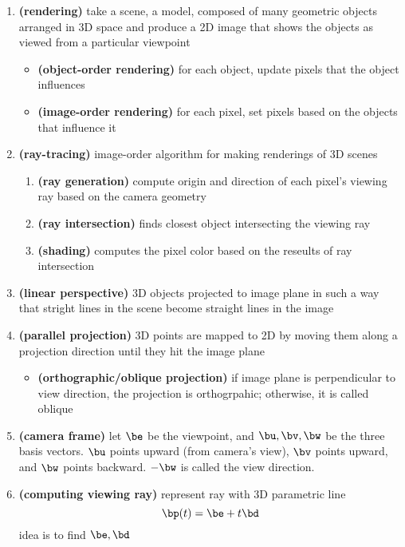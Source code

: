 \documentclass[11pt]{article}
\newcommand{\bheading}[1]{\textbf{(#1)}}
\begin{document}
\begin{enumerate}
    \item \bheading{rendering} take a scene, a model, composed of many geometric objects arranged in 3D space and produce a 2D image that shows the objects as viewed from a particular viewpoint
    \begin{itemize}
        \item \bheading{object-order rendering} for each object, update pixels that the object influences
        \item \bheading{image-order rendering} for each pixel, set pixels based on the objects that influence it
    \end{itemize}
    \item \bheading{ray-tracing} image-order algorithm for making renderings of 3D scenes
    \begin{enumerate}
        \item \bheading{ray generation} compute origin and direction of each pixel's viewing ray based on the camera geometry
        \item \bheading{ray intersection} finds closest object intersecting the viewing ray
        \item \bheading{shading} computes the pixel color based on the reseults of ray intersection
    \end{enumerate}
    \item \bheading{linear perspective} 3D objects projected to image plane in such a way that stright lines in the scene become straight lines in the image
    \item \bheading{parallel projection} 3D points are mapped to 2D by moving them along a projection direction until they hit the image plane
    \begin{itemize}
        \item \bheading{orthographic/oblique projection} if image plane is perpendicular to view direction, the projection is orthogrpahic; otherwise, it is called oblique
    \end{itemize}
    \item \bheading{camera frame} let $\be$ be the viewpoint, and $\bu,\bv,\bw$ be the three basis vectors. $\bu$ points upward (from camera's view), $\bv$ points upward, and $\bw$ points backward. $-\bw$ is called the view direction.
    \item \bheading{computing viewing ray} represent ray with 3D parametric line
    \[
        \bp(t) = \be + t\bd
    \]
    idea is to find $\be,\bd$
    \begin{enumerate}

\end{enumerate}
\end{enumerate}
\end{document}
